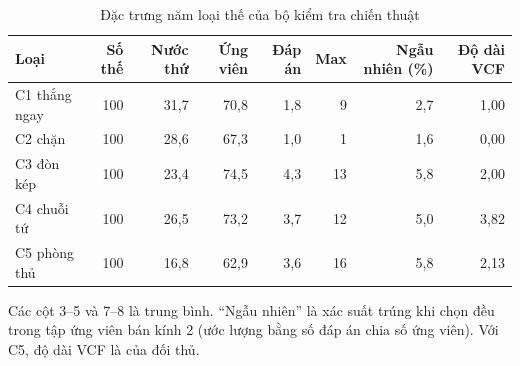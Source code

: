 \begin{table}[H]
  \centering
  \footnotesize
  \caption{Đặc trưng năm loại thế của bộ kiểm tra chiến thuật}
  \label{tab:cs-bo-mo-ta}
  \begin{tabular}{lrrrrrrr}
    \toprule
    Loại & Số thế & Nước thứ & Ứng viên & Đáp án & Max & Ngẫu nhiên (\%) & Độ dài VCF \\
    \midrule
    C1 thắng ngay & 100 & 31,7 & 70,8 & 1,8 & 9 & 2,7 & 1,00 \\
    C2 chặn & 100 & 28,6 & 67,3 & 1,0 & 1 & 1,6 & 0,00 \\
    C3 đòn kép & 100 & 23,4 & 74,5 & 4,3 & 13 & 5,8 & 2,00 \\
    C4 chuỗi tứ & 100 & 26,5 & 73,2 & 3,7 & 12 & 5,0 & 3,82 \\
    C5 phòng thủ & 100 & 16,8 & 62,9 & 3,6 & 16 & 5,8 & 2,13 \\
    \bottomrule
  \end{tabular}
  \par\smallskip\parbox{.95\linewidth}{\footnotesize Các cột 3--5 và 7--8 là trung bình. ``Ngẫu nhiên'' là xác suất trúng khi chọn đều trong tập ứng viên bán kính 2 (ước lượng bằng số đáp án chia số ứng viên). Với C5, độ dài VCF là của đối thủ.}
\end{table}
